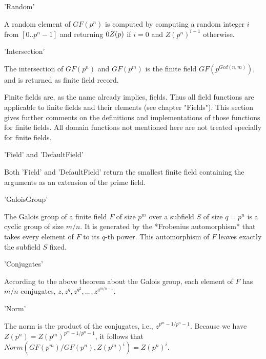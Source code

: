 'Random'

A random element of $GF(p^n)$ is  computed by  computing a random integer
$i$  from  $[0..p^n-1]$    and returning  $0\*Z(p)$  if  $i   = 0$    and
$Z(p^n)^{i-1}$ otherwise.

'Intersection'

The  intersection  of  $GF(p^n)$  and  $GF(p^m)$   is the   finite  field
$GF(p^{Gcd(n,m)})$, and is returned as finite field record.

%
%
%

Finite fields  are, as the name  already implies, fields.  Thus all field
functions are applicable to finite fields and their elements (see chapter
"Fields").  This section  gives further comments on  the  definitions and
implementations  of  those  functions  for   finite fields.   All  domain
functions not mentioned here are not treated specially for finite fields.

'Field' and 'DefaultField'

Both  'Field'   and 'DefaultField'  return  the   smallest   finite field
containing the arguments as  an extension of  the  prime field.

'GaloisGroup'

The Galois  group of a finite field $F$ of size $p^m$ over a subfield $S$
of size $q =  p^n$ is a cyclic  group of  size $m/n$.  It is generated by
the  *Frobenius automorphism*  that takes every  element of  $F$  to  its
$q$-th power.  This automorphism of  $F$  leaves exactly the subfield $S$
fixed.

'Conjugates'

According  to the above theorem about  the Galois  group, each element of
$F$ has  $m/n$ conjugates, $z,  z^q,  z^{q^2}, ..., z^{q^{m/n-1}}$.

'Norm'

The  norm is the  product of the conjugates, i.e., $z^{{p^m-1}/{p^n-1}}$.
Because  we  have $Z(p^n) =  Z(p^m)^{{p^m-1}/{p^n-1}}$, it  follows  that
$Norm( GF(p^m)/GF(p^n), Z(p^m)^i ) = Z(p^n)^i$.




